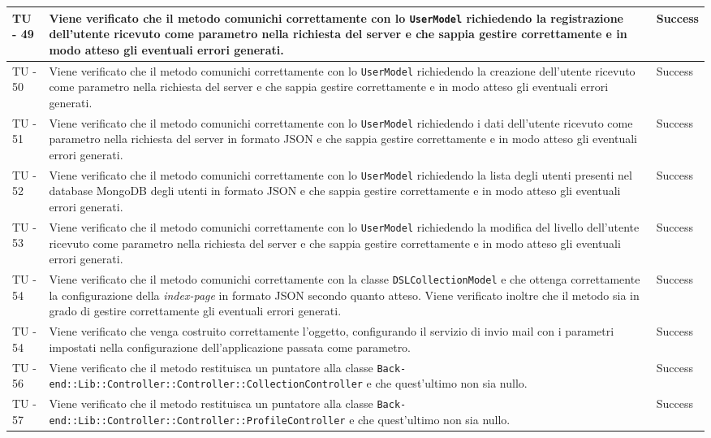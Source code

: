 \begin{center}
\begin{longtable}{ | p{3cm} | p{9cm} | p{2cm} | }
TU - 49 & Viene verificato che il metodo comunichi correttamente con lo \texttt{UserModel} richiedendo la registrazione dell'utente ricevuto come parametro nella richiesta del server e che sappia gestire correttamente e in modo atteso gli eventuali errori generati. & Success \\ \hline
TU - 50 & Viene verificato che il metodo comunichi correttamente con lo \texttt{UserModel} richiedendo la creazione dell'utente ricevuto come parametro nella richiesta del server e che sappia gestire correttamente e in modo atteso gli eventuali errori generati. & Success \\ \hline
TU - 51 & Viene verificato che il metodo comunichi correttamente con lo \texttt{UserModel} richiedendo i dati dell'utente ricevuto come parametro nella richiesta del server in formato JSON e che sappia gestire correttamente e in modo atteso gli eventuali errori generati. & Success \\ \hline
TU - 52 & Viene verificato che il metodo comunichi correttamente con lo \texttt{UserModel} richiedendo la lista degli utenti presenti nel database MongoDB degli utenti in formato JSON e che sappia gestire correttamente e in modo atteso gli eventuali errori generati. & Success \\ \hline
TU - 53 & Viene verificato che il metodo comunichi correttamente con lo \texttt{UserModel} richiedendo la modifica del livello dell'utente ricevuto come parametro nella richiesta del server e che sappia gestire correttamente e in modo atteso gli eventuali errori generati. & Success \\ \hline
TU - 54 & Viene verificato che il metodo comunichi correttamente con la classe \texttt{DSLCollectionModel} e che ottenga correttamente la configurazione della \textit{index-page} in formato JSON secondo quanto atteso. Viene verificato inoltre che il metodo sia in grado di gestire correttamente gli eventuali errori generati. & Success \\ \hline
TU - 54 & Viene verificato che venga costruito correttamente l'oggetto, configurando il servizio di invio mail con i parametri impostati nella configurazione dell'applicazione passata come parametro. & Success \\ \hline
TU - 56 & Viene verificato che il metodo restituisca un puntatore alla classe \texttt{Back-end::Lib::Controller::Controller::CollectionController} e che quest'ultimo non sia nullo. & Success \\ \hline
TU - 57 & Viene verificato che il metodo restituisca un puntatore alla classe \texttt{Back-end::Lib::Controller::Controller::ProfileController} e che quest'ultimo non sia nullo. & Success \\ \hline

\end{longtable}
\end{center}
